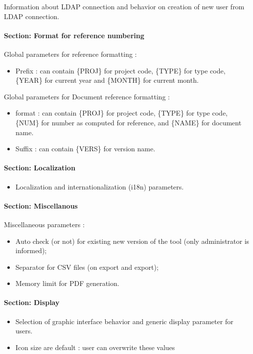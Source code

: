 \documentclass[letterpaper,10pt,english]{sphinxmanual}
\begin{document}
Information about LDAP connection and behavior on creation of new user from LDAP connection.
\paragraph{Section: Format for reference numbering}

Global parameters for reference formatting :
\begin{itemize}
\item {} 
Prefix : can contain \{PROJ\} for project code, \{TYPE\} for type code, \{YEAR\} for current year and \{MONTH\} for current month.

\end{itemize}

Global parameters for Document reference formatting :
\begin{itemize}
\item {} 
format : can contain \{PROJ\} for project code, \{TYPE\} for type code, \{NUM\} for number as computed for reference, and \{NAME\} for document name.

\item {} 
Suffix : can contain \{VERS\} for version name.

\end{itemize}
\paragraph{Section: Localization}
\begin{itemize}
\item {} 
Localization and internationalization (i18n) parameters.

\end{itemize}
\paragraph{Section: Miscellanous}

Miscellaneous parameters :
\begin{itemize}
\item {} 
Auto check (or not) for existing new version of the tool (only administrator is informed);

\item {} 
Separator for CSV files (on export and export);

\item {} 
Memory limit for PDF generation.

\end{itemize}
\paragraph{Section: Display}
\begin{itemize}
\item {} 
Selection of graphic interface behavior and generic display parameter for users.

\item {} 
Icon size are default : user can overwrite these values

\end{itemize}
\end{document}
